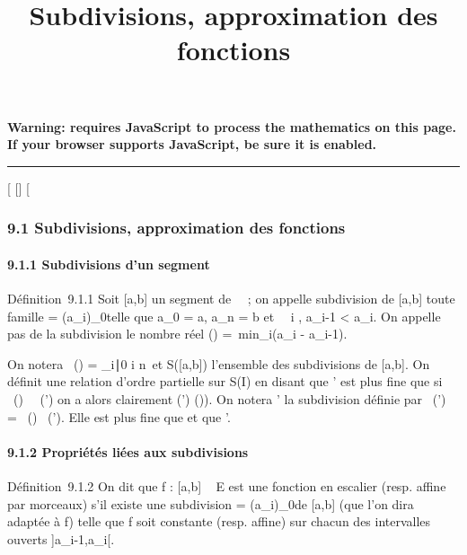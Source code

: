 \documentclass[]{article}
\title{Subdivisions, approximation des fonctions}
\author{}
\date{}
\begin{document}
\maketitle

\textbf{Warning: 
requires JavaScript to process the mathematics on this page.\\ If your
browser supports JavaScript, be sure it is enabled.}

\begin{center}\rule{3in}{0.4pt}\end{center}

[
[]
[

\subsubsection{9.1 Subdivisions, approximation des fonctions}

\paragraph{9.1.1 Subdivisions d'un segment}

Définition~9.1.1 Soit [a,b] un segment de ~~; on appelle subdivision
de [a,b] toute famille \sigma = (a_i)_0\leqi\leqn telle que
a_0 = a, a_n = b et \forall~~i \in
[1,n], a_i-1 < a_i. On appelle pas de la
subdivision \sigma le nombre réel \delta(\sigma) =\
min_i\in[1,n](a_i - a_i-1).

On notera \mathrmPt~(\sigma) =
\a_i∣0 \leq i \leq
n\ et S([a,b]) l'ensemble des subdivisions de
[a,b]. On définit une relation d'ordre partielle sur S(I) en disant
que \sigma' est plus fine que \sigma si
\mathrmPt~(\sigma)
\subset~\mathrmPt~(\sigma') on a alors
clairement \delta(\sigma') \leq \delta(\sigma)). On notera \sigma \cup \sigma' la subdivision définie par
\mathrmPt~(\sigma \cup \sigma')
= \mathrmPt~(\sigma)
\cup\mathrmPt~(\sigma'). Elle est
plus fine que \sigma et que \sigma'.

\paragraph{9.1.2 Propriétés liées aux subdivisions}

Définition~9.1.2 On dit que f : [a,b] \rightarrow~ E est une fonction en
escalier (resp. affine par morceaux) s'il existe une subdivision \sigma =
(a_i)_0\leqi\leqn de [a,b] (que l'on dira adaptée à f)
telle que f soit constante (resp. affine) sur chacun des intervalles
ouverts ]a_i-1,a_i[.
\end{document}
